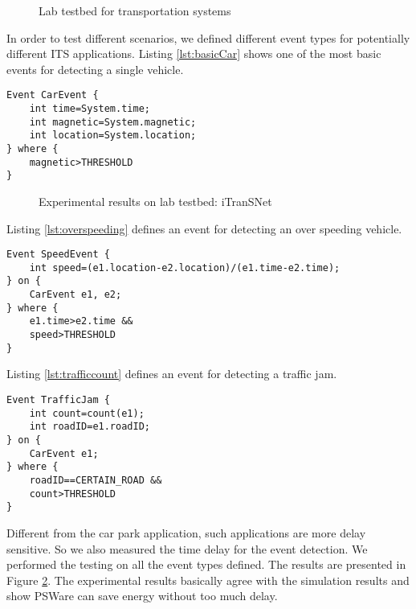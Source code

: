 \begin{figure}
\centering
{}
\caption{Lab testbed for transportation systems}
\label{fig:itransnet}
\end{figure}

In order to test different scenarios, we defined different event types for potentially different ITS applications. Listing \ref{lst:basicCar} shows one of the most basic events for detecting a single vehicle. 
\begin{lstlisting}[caption=Event definition for detecting a single vehicle, label=lst:basicCar]
Event CarEvent {
	int time=System.time;
	int magnetic=System.magnetic;
	int location=System.location;
} where {
	magnetic>THRESHOLD
}
\end{lstlisting}

\begin{figure}
\centering
{}
\caption{Experimental results on lab testbed: iTranSNet}
\label{fig:itransnetResults}
\end{figure}

Listing \ref{lst:overspeeding} defines an event for detecting an over speeding vehicle.
\begin{lstlisting}[caption=Event definition for over speeding, label=lst:overspeeding]
Event SpeedEvent {
	int speed=(e1.location-e2.location)/(e1.time-e2.time);
} on {
	CarEvent e1, e2;
} where {
	e1.time>e2.time &&
	speed>THRESHOLD
}
\end{lstlisting}

Listing \ref{lst:trafficcount} defines an event for detecting a traffic jam.
\begin{lstlisting}[caption=Event definition for traffic jam, label=lst:trafficcount]
Event TrafficJam {
	int count=count(e1);
	int roadID=e1.roadID;
} on {
	CarEvent e1;
} where {
	roadID==CERTAIN_ROAD &&
	count>THRESHOLD
}
\end{lstlisting}

Different from the car park application, such applications are more delay sensitive. So we also measured the time delay for the event detection. We performed the testing on all the event types defined. The results are presented in Figure \ref{fig:itransnetResults}. The experimental results basically agree with the simulation results and show PSWare can save energy without too much delay.

